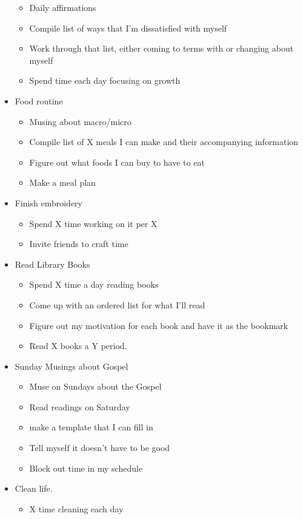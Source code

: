\documentclass[12pt]{article}[titlepage]
\renewcommand{\,}{\textsuperscript{,}}
\begin{document}
\begin{itemize}
\begin{itemize}
\item Daily affirmations  
\item Compile list of ways that I'm dissatisfied with myself  
\item Work through that list, either coming to terms with or changing about myself  
\item Spend time each day focusing on growth  
\end{itemize}  
\item Food routine  
\begin{itemize}  
\item Musing about macro/micro  
\item Compile list of X meals I can make and their accompanying information  
\item Figure out what foods I can buy to have to eat  
\item Make a meal plan  
\end{itemize}  
\item Finish embroidery  
\begin{itemize}  
\item Spend X time working on it per X  
\item Invite friends to craft time  
\end{itemize}  
\item Read Library Books  
\begin{itemize}  
\item Spend X time a day reading books  
\item Come up with an ordered list for what I'll read  
\item Figure out my motivation for each book and have it as the bookmark  
\item Read X books a Y period.  
\end{itemize}  
\item Sunday Musings about Gospel  
\begin{itemize}  
\item Muse on Sundays about the Gospel  
\item Read readings on Saturday  
\item make a template that I can fill in  
\item Tell myself it doesn't have to be good  
\item Block out time in my schedule  
\end{itemize}  
\item Clean life.  
\begin{itemize}  
\item X time cleaning each day  

\end{itemize}
\end{itemize}
\end{document}
